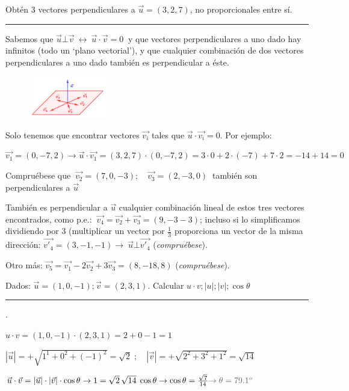 \begin{miejercicio}
	
	Obtén 3 vectores perpendiculares a $\vec u=(3,2,7)$, no proporcionales entre sí.

\rule{200pt}{0.1pt}
	
	\begin{multicols}{2}
	Sabemos que  
	$  \vec u \bot \vec v \ \leftrightarrow \ \vec u \cdot \vec v=0 \ $
	y que vectores perpendiculares a uno dado hay infinitos (todo un `plano vectorial'), y que cualquier combinación de dos vectores perpendiculares a uno dado también es perpendicular a éste.
	\begin{figure}[H]
	\centering
	\includegraphics[width=0.30\textwidth]{imagenes/imagenescv/T10IM15.png}
	\end{figure}	
	\end{multicols}	
	Solo tenemos que encontrar vectores $\vec {v_i}$ tales que $\vec u \cdot \vec {v_i}=0$. Por ejemplo:
	
	$\vec {v_1} = (0,-7,2) \to \vec u \cdot \vec {v_1}=(3,2,7)\cdot (0,-7,2)=3 \cdot 0 + 2 \cdot (-7) + 7 \cdot 2 =-14+14=0$
	
	Compruébese que $\ \vec {v_2} = (7,0,-3);  \quad \vec {v_3} = (2,-3,0) \ $ también son perpendiculares a $\vec u$
	
	También es perpendicular a $\vec u$ cualquier combinación lineal de estos tres vectores encontrados, como p.e.:
	$\ \vec {v_4}  = \vec {v_2}+\vec {v_3}= (9,-3-3)$; incluso si lo simplificamos dividiendo por 3 (multiplicar un vector por $\frac 1 3 $  proporciona un vector de la misma dirección: $\vec {v'_4}=(3,-1,-1) \to   \ \vec u \bot \vec {v'_4} $ (\emph{compruébese}).
	
	Otro más: $\vec {v_5}=\vec {v_1} - 2 \vec {v_2}+ 3\vec {v_3}= (8,-18,8)$ (\emph{compruébese}).
\end{miejercicio}
\vspace{3mm}



\begin{miejercicio}

	Dados:  $\vec u=(1,0,-1); \vec v=(2,3,1)$. Calcular $u \cdot v; |u|; |v|; \cos \theta $

\rule{200pt}{0.1pt}
.

$u \cdot v = (1,0,-1) \cdot (2,3,1)=2+0-1=1$

$|\vec u|=+\sqrt{1^1+0^2+(-1)^2}=\sqrt{2}\; ; \quad |\vec v|=+\sqrt{2^2+3^2+1^2}=\sqrt{14}$

$\vec u \cdot \vec v = |\vec u|\cdot |\vec v| \cdot \cos \theta \to 
1=\sqrt 2 \, \sqrt{14} \; \cos \theta \to \cos \theta = \frac {\sqrt{7}}{14} \textcolor{gris}{\to \theta=79.1^o}  $

\end{miejercicio}
\vspace{3mm}	



